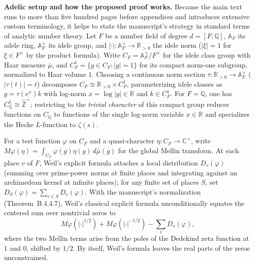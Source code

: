 \documentclass[11pt,letterpaper]{article}
\newcommand{\Q}{\mathbb{Q}}
\newcommand{\R}{\mathbb{R}}
\newcommand{\Z}{\mathbb{Z}}
\newcommand{\A}{\mathbb{A}}
\newcommand{\C}{\mathbb{C}}
\newcommand{\Zhat}{\widehat{\Z}}
\newcommand{\dd}{\,d}
\begin{document}
\textbf{Adelic setup and how the proposed proof works.} Because the main text runs to more than five hundred pages before appendices and introduces extensive custom terminology, it helps to state the manuscript's strategy in standard terms of analytic number theory. Let $F$ be a number field of degree $d=[F:\Q]$, $\A_F$ its adele ring, $\A_F^\times$ its idele group, and $|\cdot|\colon \A_F^\times\to\R_{>0}$ the idele norm ($|\xi|=1$ for $\xi\in F^\times$ by the product formula). Write $C_F = \A_F^\times/F^\times$ for the idele class group with Haar measure $\bar\mu$, and $C_F^1 = \{g\in C_F : |g|=1\}$ for its compact norm-one subgroup, normalized to Haar volume $1$. Choosing a continuous norm section $\tau\colon \R_{>0}\to\A_F^\times$ ($|\tau(t)|=t$) decomposes $C_F \cong \R_{>0}\times C_F^1$, parameterizing idele classes as $g = \tau(e^x)k$ with log-norm $x = \log|g|\in\R$ and $k\in C_F^1$. For $F=\Q$, one has $C_\Q^1 \cong \Zhat^\times$; restricting to the \emph{trivial character} of this compact group reduces functions on $C_\Q$ to functions of the single log-norm variable $x\in\R$ and specializes the Hecke $L$-function to $\zeta(s)$.

For a test function $\varphi$ on $C_F$ and a quasi-character $\eta\colon C_F\to\C^\times$, write $M\varphi(\eta) = \int_{C_F}\varphi(g)\eta(g)\dd\bar\mu(g)$ for the global Mellin transform. At each place $v$ of $F$, Weil's explicit formula attaches a local distribution $D_v(\varphi)$ (summing over prime-power norms at finite places and integrating against an archimedean kernel at infinite places); for any finite set of places $S$, set $D_S(\varphi) = \sum_{v\in S} D_v(\varphi)$. With the manuscript's normalization (Theorem~B.4.4.7), Weil's classical explicit formula unconditionally equates the centered sum over nontrivial zeros to
\[
  M\varphi(|\cdot|^{1/2}) + M\varphi(|\cdot|^{-1/2}) - \sum_v D_v(\varphi),
\]
where the two Mellin terms arise from the poles of the Dedekind zeta function at $1$ and $0$, shifted by $1/2$. By itself, Weil's formula leaves the real parts of the zeros unconstrained.
\end{document}
